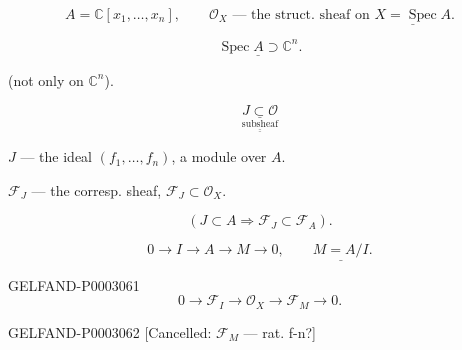 \begin{equation*}A=\mathbb C[x_1,\ldots, x_n],\qquad\mathcal O_X\text{ --- the struct. sheaf on }\underline{X=\operatorname{Spec}A}.\end{equation*}

\begin{equation*}\underline{\operatorname{Spec}A\supset\mathbb C^n}.\end{equation*}

(not only on $\mathbb C^n$).

\begin{equation*}\underset{\underline{\underline{\text{subsheaf}}}}{\underline{J\subset\mathcal O}}\end{equation*}

$J$ --- the ideal $(f_1,\ldots, f_n)$, a module over $A$.

$\mathcal F_J$ --- the corresp. sheaf, $\mathcal F_J\subset\mathcal O_X$.

\begin{equation*}(J\subset A\Rightarrow\mathcal F_J\subset\mathcal F_A).\end{equation*}



\begin{equation*}0\longrightarrow I\longrightarrow A\longrightarrow M\longrightarrow0,\qquad\underline{M=A/I}.\end{equation*}

\begin{GelfandAdjacentEvidence}{GELFAND-P000306}{1}
\begin{equation*}0\longrightarrow\mathcal F_I\longrightarrow\mathcal O_X\longrightarrow\mathcal F_M\longrightarrow0.\end{equation*}

\end{GelfandAdjacentEvidence}


\begin{GelfandAdjacentEvidence}{GELFAND-P000306}{2}
[Cancelled: $\mathcal F_M$ --- rat. f-n?]

\end{GelfandAdjacentEvidence}


